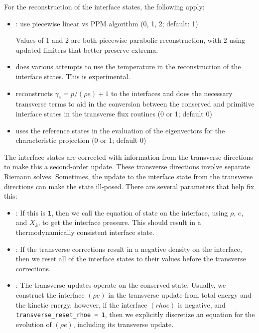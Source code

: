 For the reconstruction of the interface states, the following apply:
\begin{itemize}
\item {}: use piecewise linear vs PPM algorithm
  (0, 1, 2; default: 1)

  Values of 1 and 2 are both piecewise parabolic reconstruction, with
  2 using updated limiters that better preserve extrema.

\item {} does various attempts to use the
  temperature in the reconstruction of the interface states.  This
  is experimental.

\item {} reconstructs $\gamma_e = p/(\rho e) + 1$
  to the interfaces and does the necessary transverse terms to aid in
  the conversion between the conserved and primitive interface states
  in the transverse flux routines (0 or 1; default 0)

\item {} uses the reference states in
  the evaluation of the eigenvectors for the characteristic projection
  (0 or 1; default 0)
\end{itemize}



The interface states are corrected with information from the
transverse directions to make this a second-order update.  These
transverse directions involve separate Riemann solves.  Sometimes, the
update to the interface state from the transverse directions can make
the state ill-posed.  There are several parameters that help fix this:
\begin{itemize}
  \item {}: If this is {\tt 1}, then we call
    the equation of state on the interface, using $\rho$, $e$, and
    $X_k$, to get the interface pressure.  This should result in a
    thermodynamically consistent interface state.

  \item {}: If the transverse
    corrections result in a negative density on the interface, then we
    reset all of the interface states to their values before the
    transverse corrections.

  \item {}: The transverse updates operate
    on the conserved state.  Usually, we construct the interface
    $(\rho e)$ in the transverse update from total energy and the
    kinetic energy, however, if the interface $(rho e)$ is negative,
    and {\tt transverse\_reset\_rhoe = 1}, then we explicitly
    discretize an equation for the evolution of $(\rho e)$, including
    its transverse update.
\end{itemize}





